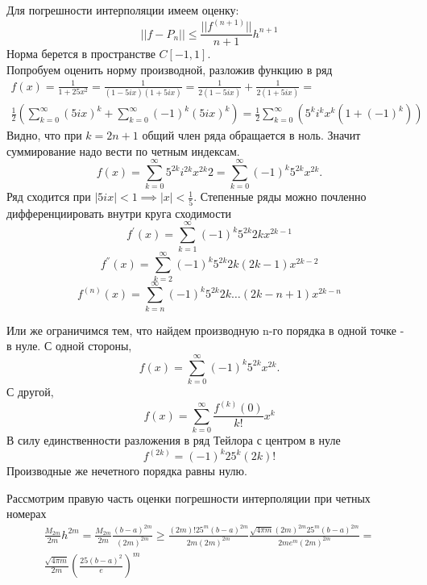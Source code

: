 \documentclass[12pt,a4paper]{article}
\begin{document}
Для погрешности интерполяции имеем оценку:
\begin{equation}
||f - P_n|| \leq \frac{||f^ {(n+1)}||}{n + 1} h^{ n + 1}
\end{equation}
Норма берется в пространстве $C[-1, 1]$. \\
Попробуем оценить норму производной, разложив функцию в ряд
	\begin{equation}
	\begin{split}
	f(x) = \frac{1}{1 + 25x^2} = \frac{1}{(1-5ix)(1+5ix)} = \frac{1}{2(1-5ix)} + \frac{1}{2(1+5ix)} = \\ \frac{1}{2} (\sum_{k=0}^\infty(5ix)^k + \sum_{k=0}^\infty(-1)^k(5ix)^k) = \frac{1}{2}\sum_{k=0}^\infty(5^k i^k x^k (1 + (-1)^k))
	\end{split}
	\end{equation}
Видно, что при $k = 2n+1$ общий член ряда обращается в ноль. Значит суммирование надо вести по четным индексам.
\begin{equation}
f(x)  = \sum_{k=0}^\infty5^{2k} i^{2k} x^{2k}  2 = \sum_{k=0}^\infty(-1)^k5^{2k} x^{2k}.
\end{equation}
Ряд сходится при $ |5ix|< 1 \implies |x| < \frac{1}{5} $.
Степенные ряды можно почленно дифференциировать внутри круга сходимости
\begin{equation}
f^{ ' }(x) = \sum_{k=1}^\infty (-1)^k 5^{2k} 2k x^{2k-1}
\end{equation}
\begin{equation}
f^{ '' }(x) = \sum_{k=2}^\infty (-1)^k 5^{2k} 2k(2k-1) x^{2k-2}
\end{equation}
\begin{equation}
f^{ (n) }(x) = \sum_{k=n}^\infty (-1)^k 5^{2k} 2k  \ldots (2k - n + 1) x^{2k - n}
\end{equation}

Или же ограничимся тем, что найдем производную n-го порядка в одной точке - в нуле. 
С одной стороны, 
$$
f(x)  = \sum_{k=0}^\infty(-1)^k5^{2k} x^{2k}.
$$
С другой, 
$$
f(x) = \sum_{k=0}^\infty \frac{f^{ (k) }(0)}{k!} x^k
$$
В силу единственности разложения в ряд Тейлора с центром в нуле
$$
f^{ (2k) } = (-1)^k 25^k (2k)!
$$
Производные же нечетного порядка равны нулю.

Рассмотрим правую часть оценки погрешности интерполяции при четных номерах
\begin{equation}
\begin{split}
\frac{M_ {2m}  }{2m} h^ {2m} = \frac{M_{2m}}{2m} \frac{(b - a) ^ {2m}}{(2m)^{ 2m} } \geq \frac{(2m)! 25^m (b - a)^ {2m} }{2m (2m)^ {2m}}  \frac{\sqrt{4\pi m} (2m) ^{2m} 25^m (b - a)^ {2m} }{2m e^m(2m) ^ {2m}} = \\ \frac{\sqrt{4\pi m}}{2m} \left(\frac{25(b-a)^2} {e} \right)^m
\end{split}
\end{equation}
\end{document}
